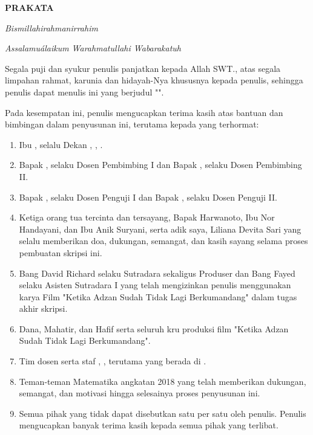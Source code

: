 

\frenchspacing
{
    {\onehalfspacing
            \begin{center}
                \textbf{PRAKATA}
            \end{center}
        }

        {\noindent
            \textit{Bismillahirahmanirrahim} \par \noindent
            \textit{Assalamu\'alaikum Warahmatullahi Wabarakatuh}
        }

    Segala puji dan syukur penulis panjatkan kepada Allah SWT., atas segala limpahan rahmat,
    karunia dan hidayah-Nya khususnya kepada penulis, sehingga penulis dapat menulis \MakeLowercase{\tipe} ini
    yang berjudul "\judul".

    Pada kesempatan ini, penulis mengucapkan terima kasih atas bantuan dan bimbingan dalam penyusunan \MakeLowercase{\tipe} ini,
    terutama kepada yang terhormat:

    \begin{enumerate}[label = \arabic*., align = left, left = 0cm, labelsep = 0.35cm, nolistsep]
        \item Ibu \dekan, selalu Dekan \fakultas, \institut, \kota.
        \item Bapak \pembimbinga, selaku Dosen Pembimbing I dan Bapak \pembimbingb, selaku Dosen Pembimbing II.
        \item Bapak \pengujia, selaku Dosen Penguji I dan Bapak \pengujib, selaku Dosen Penguji II.
        \item Ketiga orang tua tercinta dan tersayang, Bapak Harwanoto, Ibu Nor Handayani, dan Ibu Anik Suryani, serta adik saya, Liliana Devita Sari yang selalu memberikan doa,
              dukungan, semangat, dan kasih sayang selama proses pembuatan skripsi ini.
        \item Bang David Richard selaku Sutradara sekaligus Produser dan Bang Fayed selaku Asisten Sutradara I yang telah mengizinkan penulis menggunakan karya Film "Ketika Adzan Sudah Tidak Lagi Berkumandang" dalam tugas akhir skripsi.
        \item Dana, Mahatir, dan Hafif serta seluruh kru produksi film "Ketika Adzan Sudah Tidak Lagi Berkumandang".
        \item Tim dosen serta staf \fakultas, \institut, terutama yang berada di \prodi.
        \item Teman-teman Matematika angkatan 2018 yang telah memberikan dukungan, semangat, dan motivasi hingga selesainya proses penyusunan \MakeLowercase{\tipe} ini.
        \item Semua pihak yang tidak dapat disebutkan satu per satu oleh penulis. Penulis mengucapkan banyak terima kasih kepada semua pihak yang terlibat.
    \end{enumerate}

}

